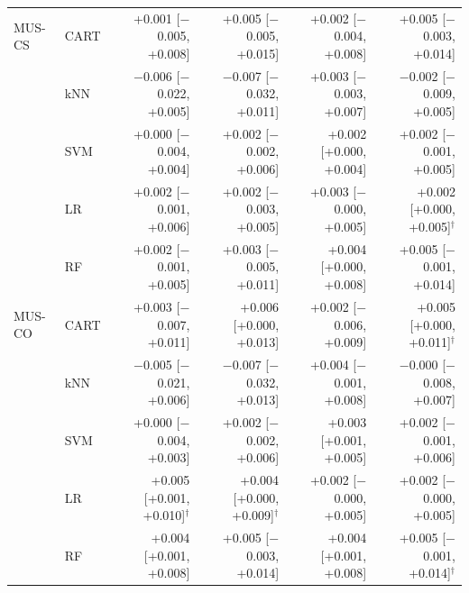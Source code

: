 \begin{table}[!htbp]
\begin{tabular}{llrrrr}
\midrule
MUS-CS & CART & +0.001 [$-$0.005, +0.008] & +0.005 [$-$0.005, +0.015] & +0.002 [$-$0.004, +0.008] & +0.005 [$-$0.003, +0.014] \\
 & kNN & $-$0.006 [$-$0.022, +0.005] & $-$0.007 [$-$0.032, +0.011] & +0.003 [$-$0.003, +0.007] & $-$0.002 [$-$0.009, +0.005] \\
 & SVM & +0.000 [$-$0.004, +0.004] & +0.002 [$-$0.002, +0.006] & +0.002 [+0.000, +0.004] & +0.002 [$-$0.001, +0.005] \\
 & LR & +0.002 [$-$0.001, +0.006] & +0.002 [$-$0.003, +0.005] & +0.003 [$-$0.000, +0.005] & +0.002 [+0.000, +0.005]$^{\dagger}$ \\
 & RF & +0.002 [$-$0.001, +0.005] & +0.003 [$-$0.005, +0.011] & +0.004 [+0.000, +0.008] & +0.005 [$-$0.001, +0.014] \\
\midrule
MUS-CO & CART & +0.003 [$-$0.007, +0.011] & +0.006 [+0.000, +0.013] & +0.002 [$-$0.006, +0.009] & +0.005 [+0.000, +0.011]$^{\dagger}$ \\
 & kNN & $-$0.005 [$-$0.021, +0.006] & $-$0.007 [$-$0.032, +0.013] & +0.004 [$-$0.001, +0.008] & $-$0.000 [$-$0.008, +0.007] \\
 & SVM & +0.000 [$-$0.004, +0.003] & +0.002 [$-$0.002, +0.006] & +0.003 [+0.001, +0.005] & +0.002 [$-$0.001, +0.006] \\
 & LR & +0.005 [+0.001, +0.010]$^{\dagger}$ & +0.004 [+0.000, +0.009]$^{\dagger}$ & +0.002 [$-$0.000, +0.005] & +0.002 [$-$0.000, +0.005] \\
 & RF & +0.004 [+0.001, +0.008] & +0.005 [$-$0.003, +0.014] & +0.004 [+0.001, +0.008] & +0.005 [$-$0.001, +0.014]$^{\dagger}$ \\
\bottomrule
\end{tabular}
\end{table}
